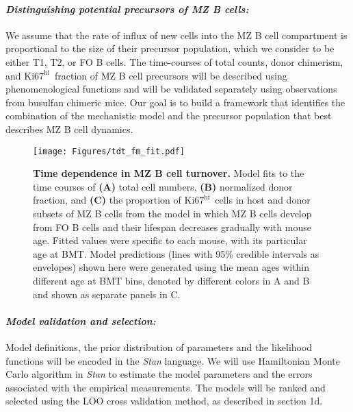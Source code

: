 \documentclass[11pt]{article}
\newcommand{\khi}{\ensuremath{\text{Ki67}^\text{hi}}~}
\newcommand{\para}[1]{\vspace*{-4.5mm}\paragraph{#1}}
\begin{document}
\para{\textit{Distinguishing potential precursors of MZ B cells:}}
We assume that the rate of influx of new cells into the MZ B cell compartment is proportional to the size of their precursor population, which we consider to be either T1, T2, or FO B cells.
The time-courses of total counts, donor chimerism, and \khi fraction of MZ B cell precursors will be described using phenomenological functions and will be validated separately using observations from busulfan chimeric mice.
Our goal is to build a framework that identifies the combination of the mechanistic model and the precursor population that best describes MZ B cell dynamics. %


\begin{wrapfigure}{r}{0.49\textwidth}
\centering
\vspace*{-5mm}
\texttt{[image: Figures/tdt\_fm\_fit.pdf]}
\vspace*{-3mm}
\caption{\textbf{Time dependence in MZ B cell turnover.} 
Model fits to the time courses of \textbf{(A)} total cell numbers, \textbf{(B)} normalized donor fraction, and  \textbf{(C)} the proportion of \khi cells in host and donor subsets of MZ B cells from the model in which MZ B cells develop from FO B cells and their lifespan decreases gradually with mouse age. Fitted values were specific to each mouse, with its particular age at BMT. 
Model predictions (lines with 95\% credible intervals as envelopes) shown here were generated using the mean ages within different age at BMT bins, denoted by different colors in A and B and shown as separate panels in C.}
\label{fig:model-fit}
\vspace*{-6mm}
\end{wrapfigure}

\para{\textit{Model validation and selection:}}
Model definitions, the prior distribution of parameters and the likelihood functions will be encoded in the \textit{Stan} language.
We will use Hamiltonian Monte Carlo algorithm in \textit{Stan} to estimate the model parameters and the errors associated with the empirical measurements.
The models will be ranked and selected using the LOO cross validation method, as described in section 1d. %
\end{document}

